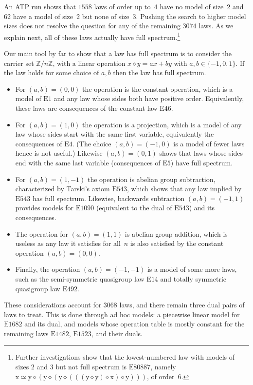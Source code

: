 \documentclass[12pt]{amsart}
\theoremstyle{definition}
\newcommand{\x}{\mathrm{x}}
\newcommand{\y}{\mathrm{y}}
\newcommand{\op}{\diamond}
\newcommand{\formaleq}{\simeq}
\newcommand{\Eq}[1]{\mathrm{E}#1}
\begin{document}
An ATP run shows that $\num{1558}$ laws of order up to~$4$ have no model of size~$2$ and $\num{62}$ have a model of size~$2$ but none of size~$3$.  Pushing the search to higher model sizes does not resolve the question for any of the remaining $\num{3074}$ laws.  As we explain next, all of these laws actually have full spectrum.\footnote{Further investigations show that the lowest-numbered law with models of sizes $2$ and $3$ but not full spectrum is $\Eq{80887}$, namely $\x \formaleq \y \op (\y \op (\y \op (((\y \op \y) \op \x) \op \y)))$, of order~$6$.}


Our main tool by far to show that a law has full spectrum is to consider the carrier set $\mathbb{Z}/n\mathbb{Z}$, with a linear operation $x\op y = ax+by$ with $a,b\in\{-1,0,1\}$.  If the law holds for some choice of $a,b$ then the law has full spectrum.
\begin{itemize}
\item For $(a,b)=(0,0)$ the operation is the constant operation, which is a model of $\Eq{1}$ and any law whose sides both have positive order.  Equivalently, these laws are consequences of the constant law $\Eq{46}$.
\item For $(a,b)=(1,0)$ the operation is a projection, which is a model of any law whose sides start with the same first variable, equivalently the consequences of $\Eq{4}$.  (The choice $(a,b)=(-1,0)$ is a model of fewer laws hence is not useful.)  Likewise $(a,b)=(0,1)$ shows that laws whose sides end with the same last variable (consequences of $\Eq{5}$) have full spectrum.
\item For $(a,b)=(1,-1)$ the operation is abelian group subtraction, characterized by Tarski's axiom $\Eq{543}$, which shows that any law implied by $\Eq{543}$ has full spectrum.  Likewise, backwards subtraction $(a,b)=(-1,1)$ provides models for $\Eq{1090}$ (equivalent to the dual of $\Eq{543}$) and its consequences.
\item The operation for $(a,b)=(1,1)$ is abelian group addition, which is useless as any law it satisfies for all~$n$ is also satisfied by the constant operation $(a,b)=(0,0)$.
\item Finally, the operation $(a,b)=(-1,-1)$ is a model of some more laws, such as the semi-symmetric quasigroup law $\Eq{14}$ and totally symmetric quasigroup law $\Eq{492}$.
\end{itemize}
These considerations account for $\num{3068}$ laws, and there remain three dual pairs of laws to treat.  This is done through ad hoc models: a piecewise linear model for $\Eq{1682}$ and its dual, and models whose operation table is mostly constant for the remaining laws $\Eq{1482}$, $\Eq{1523}$, and their duals.
\end{document}
